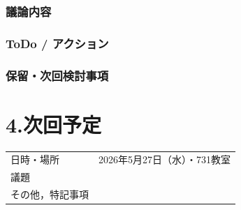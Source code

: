 \documentclass[a4paper,12pt]{ltjsarticle}
\begin{document}
\subsubsection*{議論内容}

\subsubsection*{ToDo / アクション}

\subsubsection*{保留・次回検討事項}

\section*{4.次回予定}
\begin{tabular}{ll}
  \toprule
  日時・場所 & 2026年5月27日（水）・731教室 \\
  議題       &  \\
  その他，特記事項 & \\
  \bottomrule
\end{tabular}
\end{document}
